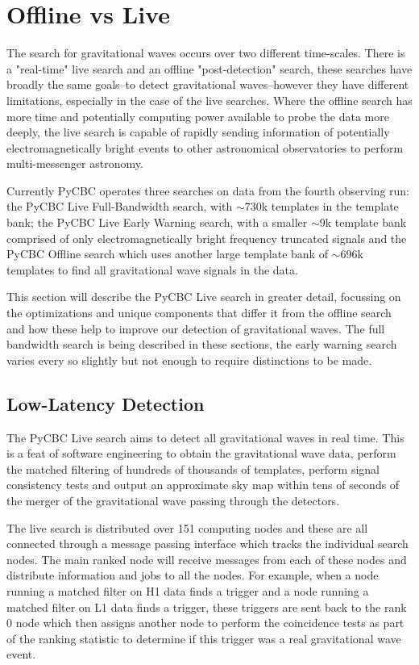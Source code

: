 \section{\label{2:sec:offline-vs-live}Offline vs Live}

The search for gravitational waves occurs over two different time-scales. There is a "real-time" live search and an offline "post-detection" search, these searches have broadly the same goals--to detect gravitational waves--however they have different limitations, especially in the case of the live searches. Where the offline search has more time and potentially computing power available to probe the data more deeply, the live search is capable of rapidly sending information of potentially electromagnetically bright events to other astronomical observatories to perform multi-messenger astronomy.

Currently PyCBC operates three searches on data from the fourth observing run: the PyCBC Live Full-Bandwidth search, with $\sim$730k templates in the template bank; the PyCBC Live Early Warning search, with a smaller $\sim$9k template bank comprised of only electromagnetically bright frequency truncated signals and the PyCBC Offline search which uses another large template bank of $\sim$696k templates to find all gravitational wave signals in the data.

This section will describe the PyCBC Live search in greater detail, focussing on the optimizations and unique components that differ it from the offline search and how these help to improve our detection of gravitational waves. The full bandwidth search is being described in these sections, the early warning search varies every so slightly but not enough to require distinctions to be made.

\subsection{\label{2:sec:low-latency-detection}Low-Latency Detection}

The PyCBC Live search aims to detect all gravitational waves in real time. This is a feat of software engineering to obtain the gravitational wave data, perform the matched filtering of hundreds of thousands of templates, perform signal consistency tests and output an approximate sky map within tens of seconds of the merger of the gravitational wave passing through the detectors.

The live search is distributed over 151 computing nodes and these are all connected through a message passing interface which tracks the individual search nodes. The main ranked node will receive messages from each of these nodes and distribute information and jobs to all the nodes. For example, when a node running a matched filter on H1 data finds a trigger and a node running a matched filter on L1 data finds a trigger, these triggers are sent back to the rank 0 node which then assigns another node to perform the coincidence tests as part of the ranking statistic to determine if this trigger was a real gravitational wave event.

